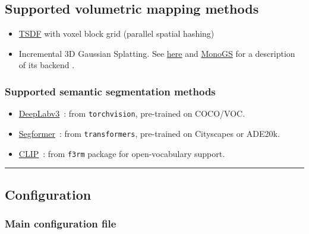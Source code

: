 \documentclass{article}
\providecommand{\tightlist}{%
  \setlength{\itemsep}{0pt}\setlength{\parskip}{0pt}}
\begin{document}
\hypertarget{supported-volumetric-mapping-methods}{%
\subsection{Supported volumetric mapping
methods}\label{supported-volumetric-mapping-methods}}

\begin{itemize}
\tightlist
\item
  \href{https://arxiv.org/pdf/2110.00511}{TSDF} with voxel block grid
  (parallel spatial hashing)~\cite{dong2022ash}
\item
  Incremental 3D Gaussian Splatting. See
  \href{https://repo-sam.inria.fr/fungraph/3d-gaussian-splatting/}{here}
  and \href{https://arxiv.org/abs/2312.06741}{MonoGS} for a description
  of its backend \cite{matsuki2023gaussian, kerbl20233d}.
\end{itemize}

\hypertarget{supported-semantic-segmentation-methods}{%
\subsubsection{Supported semantic segmentation
methods}\label{supported-semantic-segmentation-methods}}

\begin{itemize}
\tightlist
\item
  \href{https://arxiv.org/abs/1706.05587}{DeepLabv3}~\cite{chen2017rethinking}: from \texttt{torchvision}, pre-trained on COCO/VOC.
\item
  \href{https://arxiv.org/abs/2105.15203}{Segformer}~\cite{xie2021segformer}: from \texttt{transformers}, pre-trained on Cityscapes or ADE20k.
\item
  \href{https://arxiv.org/abs/2212.09506}{CLIP}~\cite{lin2023clip}: from \texttt{f3rm} package for open-vocabulary support.
\end{itemize}

\begin{center}\rule{0.5\linewidth}{0.5pt}\end{center}

\hypertarget{configuration}{%
\subsection{Configuration}\label{configuration}}

\hypertarget{main-configuration-file}{%
\subsubsection{Main configuration file}\label{main-configuration-file}}
\end{document}
